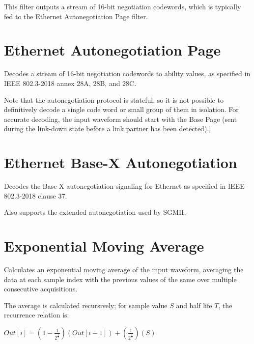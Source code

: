 This filter outputs a stream of 16-bit negotiation codewords, which is typically fed to the Ethernet Autonegotiation
Page filter.

\pagebreak
\section{Ethernet Autonegotiation Page}

Decodes a stream of 16-bit negotiation codewords to ability values, as specified in IEEE 802.3-2018 annex 28A, 28B, and
28C.

Note that the autonegotiation protocol is stateful, so it is not possible to definitively decode a single code word or
small group of them in isolation. For accurate decoding, the input waveform should start with the Base Page (sent
during the link-down state before a link partner has been detected).]

\pagebreak
\section{Ethernet Base-X Autonegotiation}

Decodes the Base-X autonegotiation signaling for Ethernet as specified in IEEE 802.3-2018 clause 37.

Also supports the extended autonegotiation used by SGMII.

\pagebreak
\section{Exponential Moving Average}
\label{filter:ema}

Calculates an exponential moving average of the input waveform, averaging the data at each sample index with the
previous values of the same over multiple consecutive acquisitions.

The average is calculated recursively; for sample value $S$ and half life $T$, the recurrence relation is:

\begin{math}
Out[i] =
	\left(1-\frac{1}{\displaystyle{2^\frac{1}{x}}}\right)\left(Out[i-1]\right) +
	\left(\frac{1}{\displaystyle{2^\frac{1}{x}}}\right)\left(S\right)
\end{math}

